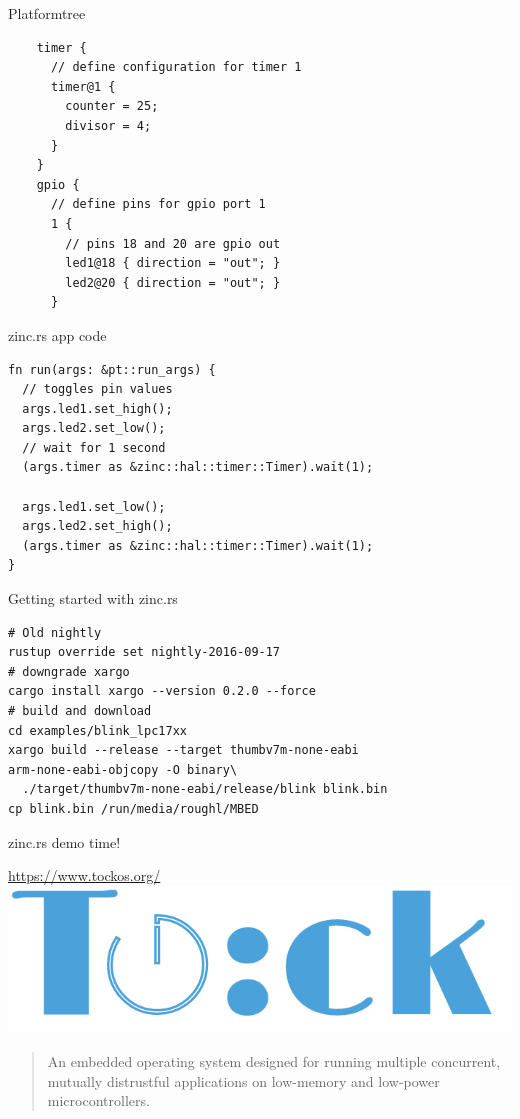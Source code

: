 \documentclass[aspectratio=1610,14pt,t]{beamer}
\begin{document}
\begin{frame}[c,fragile]{Platformtree}
  \begin{verbatim}
    timer {
      // define configuration for timer 1
      timer@1 {
        counter = 25;
        divisor = 4;
      }
    }
    gpio {
      // define pins for gpio port 1
      1 {
        // pins 18 and 20 are gpio out
        led1@18 { direction = "out"; }
        led2@20 { direction = "out"; }
      }
  \end{verbatim}
\end{frame}

\begin{frame}[c,fragile]{zinc.rs app code}
  \begin{verbatim}
fn run(args: &pt::run_args) {
  // toggles pin values
  args.led1.set_high();
  args.led2.set_low();
  // wait for 1 second
  (args.timer as &zinc::hal::timer::Timer).wait(1);

  args.led1.set_low();
  args.led2.set_high();
  (args.timer as &zinc::hal::timer::Timer).wait(1);
}
  \end{verbatim}
\end{frame}

\begin{frame}[fragile]{Getting started with zinc.rs}
  \begin{verbatim}
# Old nightly
rustup override set nightly-2016-09-17
# downgrade xargo
cargo install xargo --version 0.2.0 --force
# build and download
cd examples/blink_lpc17xx
xargo build --release --target thumbv7m-none-eabi
arm-none-eabi-objcopy -O binary\
  ./target/thumbv7m-none-eabi/release/blink blink.bin
cp blink.bin /run/media/roughl/MBED
  \end{verbatim}
\end{frame}

\begin{frame}[c]{zinc.rs demo time!}
\end{frame}

\begin{frame}[c]{\url{https://www.tockos.org/}}
  \centering
  \includegraphics[width=.8\textwidth]{img/tock.png}

  \begin{quote}
    An embedded operating system designed for running multiple concurrent,
    mutually distrustful applications on low-memory and low-power
    microcontrollers.
  \end{quote}
\end{frame}
\end{document}
